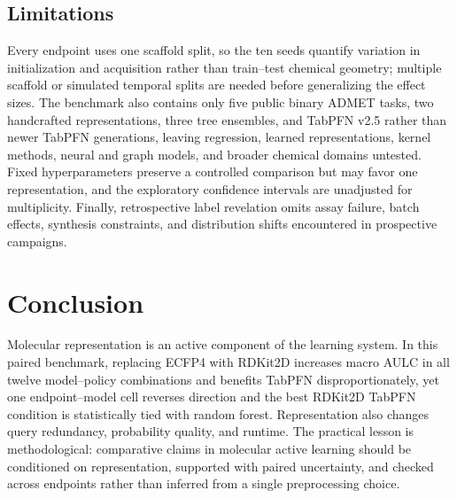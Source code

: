 \documentclass[twoside,11pt]{article}
\begin{document}
\subsection{Limitations}\label{sec:limitations}
Every endpoint uses one scaffold split, so the ten seeds quantify variation in initialization and acquisition rather than train--test chemical geometry; multiple scaffold or simulated temporal splits are needed before generalizing the effect sizes. The benchmark also contains only five public binary ADMET tasks, two handcrafted representations, three tree ensembles, and TabPFN v2.5 rather than newer TabPFN generations, leaving regression, learned representations, kernel methods, neural and graph models, and broader chemical domains untested. Fixed hyperparameters preserve a controlled comparison but may favor one representation, and the exploratory confidence intervals are unadjusted for multiplicity. Finally, retrospective label revelation omits assay failure, batch effects, synthesis constraints, and distribution shifts encountered in prospective campaigns.

\section{Conclusion}
Molecular representation is an active component of the learning system. In this paired benchmark, replacing ECFP4 with RDKit2D increases macro AULC in all twelve model--policy combinations and benefits TabPFN disproportionately, yet one endpoint--model cell reverses direction and the best RDKit2D TabPFN condition is statistically tied with random forest. Representation also changes query redundancy, probability quality, and runtime. The practical lesson is methodological: comparative claims in molecular active learning should be conditioned on representation, supported with paired uncertainty, and checked across endpoints rather than inferred from a single preprocessing choice.

\appendix
\end{document}
